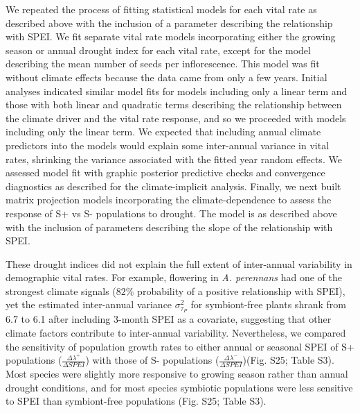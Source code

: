 \documentclass[12pt]{article}
\begin{document}
We repeated the process of fitting statistical models for each vital rate as described above with the inclusion of a parameter describing the relationship with SPEI. 
We fit separate vital rate models incorporating either the growing season or annual drought index for each vital rate, except for the model describing the mean number of seeds per inflorescence. 
This model was fit without climate effects because the data came from only a few years.
Initial analyses indicated similar model fits for models including only a linear term and those with both linear and  quadratic terms describing the relationship between the climate driver and the vital rate response, and so we proceeded with models including only the linear term.
We expected that including annual climate predictors into the models would explain some inter-annual variance in vital rates, shrinking the variance associated with the fitted year random effects.
We assessed model fit with graphic posterior predictive checks and convergence diagnostics as described for the climate-implicit analysis. 
Finally, we next built matrix projection models incorporating the climate-dependence to assess the response of S+ vs S- populations to drought. 
The model is as described above with the inclusion of parameters describing the slope of the relationship with SPEI. 

These drought indices did not explain the full extent of inter-annual variability in demographic vital rates.
For example, flowering in \emph{A. perennans} had one of the strongest climate signals ($82\%$ probability of a positive relationship with SPEI), yet the estimated inter-annual variance $\sigma^2_{\tau_{P}}$ for symbiont-free plants shrank from 6.7 to 6.1 after including 3-month SPEI as a covariate, suggesting that other climate factors contribute to inter-annual variability.
Nevertheless, we compared the sensitivity of population growth rates to either annual or seasonal SPEI of S+ populations ($\frac{\Delta\lambda^{+}}{\Delta SPEI}$) with those of S- populations ($\frac{\Delta\lambda^{-}}{\Delta SPEI}$)(Fig. S25; Table S3).
Most species were slightly more responsive to growing season rather than annual drought conditions, and for most species symbiotic populations were less sensitive to SPEI than symbiont-free populations (Fig. S25; Table S3).
\end{document}
